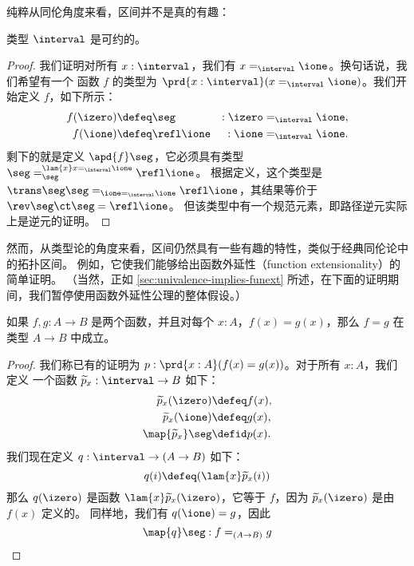 纯粹从同伦角度来看，区间并不是真的有趣：

\begin{lem}\label{thm:contr-interval}
类型 $\interval$ 是可约的。
\end{lem}

\begin{proof}
  我们证明对所有 $x:\interval$，我们有 $x=_\interval\ione$。换句话说，我们希望有一个
  函数 $f$ 的类型为 $\prd{x:\interval}(x=_\interval\ione)$。我们开始定义 $f$，如下所示：
  \begin{alignat*}{2}
    f(\izero)&\defeq \seg  &:\izero&=_\interval\ione,\\
    f(\ione)&\defeq \refl\ione &:\ione &=_\interval\ione.
  \end{alignat*}
  剩下的就是定义 $\apd{f}\seg$，它必须具有类型 $\seg =_\seg^{\lam{x} x=_\interval\ione}\refl \ione$。
  根据定义，这个类型是 $\trans\seg\seg=_{\ione=_\interval\ione}\refl\ione$，其结果等价于 $\rev\seg\ct\seg=\refl\ione$。
  但该类型中有一个规范元素，即路径逆元实际上是逆元的证明。
\end{proof}

然而，从类型论的角度来看，区间仍然具有一些有趣的特性，类似于经典同伦论中的拓扑区间。
例如，它使我们能够给出函数外延性（function extensionality）的简单证明。
（当然，正如 \cref{sec:univalence-implies-funext} 所述，在下面的证明期间，我们暂停使用函数外延性公理的整体假设。）

\begin{lem}\label{thm:interval-funext}
%
如果 $f,g:A\to{}B$ 是两个函数，并且对每个 $x:A$，$f(x)=g(x)$，那么
$f=g$ 在类型 $A\to{}B$ 中成立。
\end{lem}

\begin{proof}
  我们称已有的证明为 $p:\prd{x:A}(f(x)=g(x))$。对于所有 $x:A$，我们定义
  一个函数 $\widetilde{p}_x:\interval\to{}B$ 如下：
  \begin{align*}
    \widetilde{p}_x(\izero) &\defeq f(x), \\
    \widetilde{p}_x(\ione) &\defeq g(x), \\
    \map{\widetilde{p}_x}\seg &\defid p(x).
  \end{align*}
  我们现在定义 $q:\interval\to(A\to{}B)$ 如下：
  \[q(i)\defeq(\lam{x} \widetilde{p}_x(i))\]
  那么 $q(\izero)$ 是函数 $\lam{x} \widetilde{p}_x(\izero)$，它等于 $f$，因为 $\widetilde{p}_x(\izero)$ 是由 $f(x)$ 定义的。
  同样地，我们有 $q(\ione)=g$，因此
  \[\map{q}\seg:f=_{(A\to{}B)}g \qedhere\]
\end{proof}

